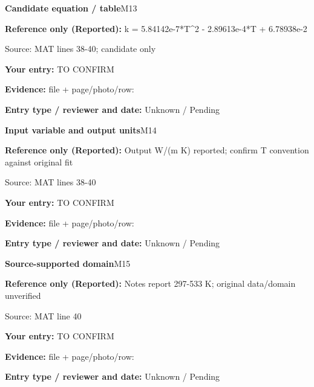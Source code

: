 \documentclass[11pt]{article}
\begin{document}
\par\noindent\begin{minipage}{\textwidth}\small
{\color{navy}\bfseries Candidate equation / table}\hfill M13\par
\colorbox{pale}{\parbox{\dimexpr\linewidth-2\fboxsep\relax}{
\textbf{Reference only (Reported):} k = 5.84142e-7*T\textasciicircum{}2 - 2.89613e-4*T + 6.78938e-2\par
{\footnotesize Source: MAT lines 38-40; candidate only}}}\par
\textbf{Your entry:} {\color{muted}TO CONFIRM}\enspace\hrulefill\par
{\footnotesize\textbf{Evidence:} file + page/photo/row: \hrulefill\par
\textbf{Entry type / reviewer and date:} Unknown / Pending\par
}\end{minipage}\par\vspace{5pt}
\par\noindent\begin{minipage}{\textwidth}\small
{\color{navy}\bfseries Input variable and output units}\hfill M14\par
\colorbox{pale}{\parbox{\dimexpr\linewidth-2\fboxsep\relax}{
\textbf{Reference only (Reported):} Output W/(m K) reported; confirm T convention against original fit\par
{\footnotesize Source: MAT lines 38-40}}}\par
\textbf{Your entry:} {\color{muted}TO CONFIRM}\enspace\hrulefill\par
{\footnotesize\textbf{Evidence:} file + page/photo/row: \hrulefill\par
\textbf{Entry type / reviewer and date:} Unknown / Pending\par
}\end{minipage}\par\vspace{5pt}
\par\noindent\begin{minipage}{\textwidth}\small
{\color{navy}\bfseries Source-supported domain}\hfill M15\par
\colorbox{pale}{\parbox{\dimexpr\linewidth-2\fboxsep\relax}{
\textbf{Reference only (Reported):} Notes report 297-533 K; original data/domain unverified\par
{\footnotesize Source: MAT line 40}}}\par
\textbf{Your entry:} {\color{muted}TO CONFIRM}\enspace\hrulefill\par
{\footnotesize\textbf{Evidence:} file + page/photo/row: \hrulefill\par
\textbf{Entry type / reviewer and date:} Unknown / Pending\par
}\end{minipage}\par\vspace{5pt}
\end{document}
